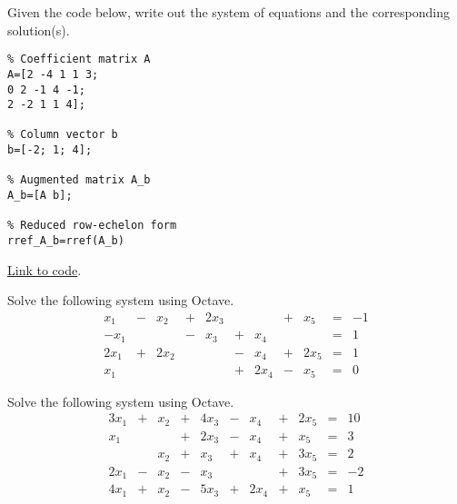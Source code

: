 \documentclass{ximera}
\begin{document}
\begin{problem}\label{prob_oct_sys_0}
    Given the code below, write out the system of equations and the corresponding solution(s).

    \begin{verbatim}
% Coefficient matrix A
A=[2 -4 1 1 3;
0 2 -1 4 -1;
2 -2 1 1 4];

% Column vector b
b=[-2; 1; 4];

% Augmented matrix A_b
A_b=[A b];

% Reduced row-echelon form
rref_A_b=rref(A_b)
    \end{verbatim}

\href{https://sagecell.sagemath.org/?z=eJxFjcEKwjAQRO-B_MNcCnoI2NpbySH4B16LFJtuNNA0sKTq57sVVBaGGeaxU-GUKYToIy0F6Vo4vuC0crZvYFrUcsdOqwMk1mhFJIlvPlV7kaRVJV_mNS14kC-ZMWo12t40Heruz7j1lmSFpt_OIKCI7R3GL3WmafXCcH4a8nea84KQOWnFTGHY8M3sxOzf0oYzHQ==&lang=octave&interacts=eJyLjgUAARUAuQ==}{Link to code}.    
\end{problem}

\begin{problem}\label{prob_oct_sys_1}
 Solve the following system using Octave.
 \begin{equation}
    \begin{array}{ccccccccccc}
          x_1 &- &x_2&+&2x_3&&&+&x_5&= &-1 \\
         -x_1&&&-&x_3&+&x_4&&&=&1\\
         2x_1&+&2x_2&&&-&x_4&+&2x_5&=&1\\
         x_1&&&&&+&2x_4&-&x_5&=&0
        \end{array}
        \end{equation}   

\end{problem}

\begin{problem}\label{prob_oct_sys_2}
    Solve the following system using Octave.
    \begin{equation}
       \begin{array}{ccccccccccc}
             3x_1&+&x_2&+&4x_3&-&x_4&+&2x_5&= &10 \\
            x_1&&&+&2x_3&-&x_4&+&x_5&=&3\\
            &&x_2&+&x_3&+&x_4&+&3x_5&=&2\\
            2x_1&-&x_2&-&x_3&&&+&3x_5&=&-2\\
            4x_1&+&x_2&-&5x_3&+&2x_4&+&x_5&=&1
        \end{array}
    \end{equation}   
\end{problem}
\end{document}
